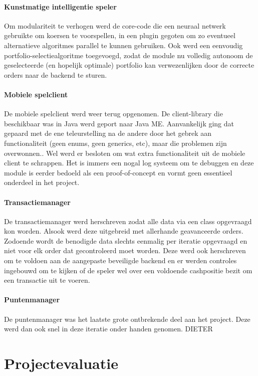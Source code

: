 \subsubsection{Kunstmatige intelligentie speler}
Om modulariteit te verhogen werd de core-code die een neuraal netwerk gebruikte om koersen te voorspellen, in een plugin gegoten om zo eventueel alternatieve algoritmes parallel te kunnen gebruiken. Ook werd een eenvoudig portfolio-selectiealgoritme toegevoegd, zodat de module nu volledig autonoom de geselecteerde (en hopelijk optimale) portfolio kan verwezenlijken door de correcte orders naar de backend te sturen.

\subsubsection{Mobiele spelclient}
De mobiele spelclient werd weer terug opgenomen. De client-library die beschikbaar was in Java werd geport naar Java ME. Aanvankelijk ging dat gepaard met de ene teleurstelling na de andere door het gebrek aan functionaliteit (geen enums, geen generics, etc), maar die problemen zijn overwonnen.. Wel werd er besloten om wat extra functionaliteit uit de mobiele client te schrappen. Het is immers een nogal log systeem om te debuggen en deze module is eerder bedoeld als een proof-of-concept en vormt geen essentieel onderdeel in het project.

\subsubsection{Transactiemanager}
De transactiemanager werd herschreven zodat alle data via een class opgevraagd kon worden. Alsook werd deze uitgebreid met allerhande geavanceerde orders.
Zodoende wordt de benodigde data slechts eenmalig per iteratie opgevraagd en niet voor elk order dat gecontroleerd moet worden. Deze werd ook herschreven om te voldoen aan de aangepaste beveiligde backend en er werden controles ingebouwd om te kijken of de speler wel over een voldoende cashpositie bezit om een transactie uit te voeren.

\subsubsection{Puntenmanager}
De puntenmanager was het laatste grote ontbrekende deel aan het project. Deze werd dan ook snel in deze iteratie onder handen genomen.
\todo DIETER


\chapter{Projectevaluatie}

